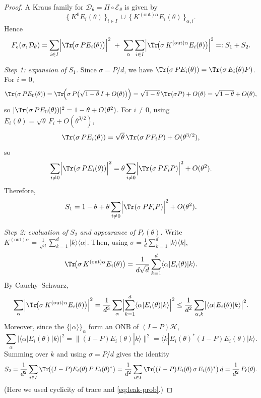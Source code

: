\documentclass[12pt]{article}
\theoremstyle{definition} %
\theoremstyle{plain} %
\theoremstyle{remark} %
\theoremstyle{underline}
\begin{document}
\decoder*

\begin{proof}
A Kraus family for $\mathcal D_\theta=\Pi\circ\mathcal E_\theta$ is given by
\[
\{\,K^0E_i(\theta)\,\}_{i\in I}
\ \cup\
\{\,K^{(\mathrm{out})\alpha}E_i(\theta)\,\}_{\alpha,i}.
\]
Hence
\begin{equation}\label{eq:Fe-split}
F_e(\sigma,\mathcal D_\theta)
=
\sum_{i\in I}\Bigl|\Tr\!\bigl(\sigma\,P E_i(\theta)\bigr)\Bigr|^2
\;+\;
\sum_{\alpha}\sum_{i\in I}\Bigl|\Tr\!\bigl(\sigma\,K^{(\mathrm{out})\alpha}E_i(\theta)\bigr)\Bigr|^2
=:S_1+S_2.
\end{equation}

\smallskip
\noindent\emph{Step 1: expansion of $S_1$.}
Since $\sigma=P/d$, we have $\Tr(\sigma\,PE_i(\theta))=\Tr(\sigma\,E_i(\theta)P)$.
For $i=0$,
\[
\Tr(\sigma\,P E_0(\theta))
=
\Tr\!\Bigl(\sigma\,P\bigl(\sqrt{1-\theta}\,I+O(\theta)\bigr)\Bigr)
=
\sqrt{1-\theta}\,\Tr(\sigma P)+O(\theta)
=
\sqrt{1-\theta}+O(\theta),
\]
so $|\Tr(\sigma\,PE_0(\theta))|^2=1-\theta+O(\theta^2)$.
For $i\neq 0$, using $E_i(\theta)=\sqrt\theta\,F_i+O(\theta^{3/2})$,
\[
\Tr(\sigma\,P E_i(\theta))
=
\sqrt\theta\,\Tr(\sigma\,PF_iP)+O(\theta^{3/2}),
\]
so
\[
\sum_{i\neq 0}\Bigl|\Tr(\sigma\,P E_i(\theta))\Bigr|^2
=
\theta\sum_{i\neq 0}\Bigl|\Tr(\sigma\,PF_iP)\Bigr|^2+O(\theta^2).
\]
Therefore,
\begin{equation}\label{eq:S1}
S_1
=
1-\theta
+\theta\sum_{i\neq 0}\Bigl|\Tr(\sigma\,PF_iP)\Bigr|^2
+O(\theta^2).
\end{equation}

\smallskip
\noindent\emph{Step 2: evaluation of $S_2$ and appearance of $P_\ell(\theta)$.}
Write $K^{(\mathrm{out})\alpha}=\frac{1}{\sqrt d}\sum_{k=1}^d |k\rangle\langle\alpha|$.
Then, using $\sigma=\frac{1}{d}\sum_{k=1}^d |k\rangle\langle k|$,
\[
\Tr\!\bigl(\sigma\,K^{(\mathrm{out})\alpha}E_i(\theta)\bigr)
=
\frac{1}{d\sqrt d}\sum_{k=1}^d\langle \alpha|E_i(\theta)|k\rangle.
\]
By Cauchy--Schwarz,
\[
\sum_\alpha\Bigl|\Tr\!\bigl(\sigma\,K^{(\mathrm{out})\alpha}E_i(\theta)\bigr)\Bigr|^2
=
\frac{1}{d^3}\sum_\alpha\Bigl|\sum_{k=1}^d\langle \alpha|E_i(\theta)|k\rangle\Bigr|^2
\le
\frac{1}{d^2}\sum_{\alpha,k}\bigl|\langle \alpha|E_i(\theta)|k\rangle\bigr|^2.
\]
Moreover, since the $\{|\alpha\rangle\}_\alpha$ form an ONB of $(I-P)\mathcal H$,
\[
\sum_{\alpha}\bigl|\langle \alpha|E_i(\theta)|k\rangle\bigr|^2
=
\|(I-P)E_i(\theta)|k\rangle\|^2
=
\langle k|E_i(\theta)^*(I-P)E_i(\theta)|k\rangle.
\]
Summing over $k$ and using $\sigma=P/d$ gives the identity
\begin{equation}\label{eq:S2-leak}
S_2
=
\frac{1}{d^2}\sum_{i\in I}\Tr\!\bigl((I-P)E_i(\theta)\,P\,E_i(\theta)^*\bigr)
=
\frac{1}{d^2}\sum_{i\in I}\Tr\!\bigl((I-P)E_i(\theta)\,\sigma\,E_i(\theta)^*\bigr)\,d
=
\frac{1}{d^2}\,P_\ell(\theta).
\end{equation}
(Here we used cyclicity of trace and \eqref{eq:leak-prob}.)


\end{proof}
\end{document}
